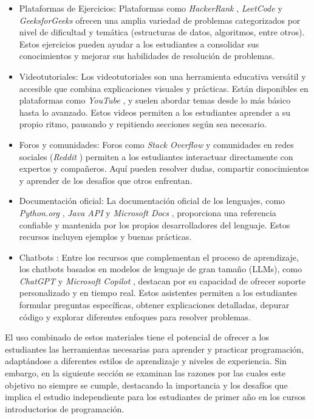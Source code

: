 \documentclass{article}
\begin{document}
\begin{itemize}
    \item Plataformas de Ejercicios: 
    Plataformas como \textit{HackerRank} \cite{hackerrank}, \textit{LeetCode} \cite{leetcode}  y \textit{GeeksforGeeks} \cite{geeksforgeeks} ofrecen una amplia variedad de problemas categorizados por nivel de dificultad y temática (estructuras de datos, algoritmos, entre otros). Estos ejercicios pueden ayudar a los estudiantes a consolidar sus conocimientos y mejorar sus habilidades de resolución de problemas.

    \item Videotutoriales:
    Los videotutoriales son una herramienta educativa versátil y accesible que combina explicaciones visuales y prácticas. Están disponibles en plataformas como \textit{YouTube} \cite{youtube}, y suelen abordar temas desde lo más básico hasta lo avanzado. Estos videos permiten a los estudiantes aprender a su propio ritmo, pausando y repitiendo secciones según sea necesario.

    \item Foros y comunidades: 
    Foros como \textit{Stack Overflow} \cite{stackoverflow} y comunidades en redes sociales (\textit{Reddit} \cite{reddit}) permiten a los estudiantes interactuar directamente con expertos y compañeros. Aquí pueden resolver dudas, compartir conocimientos y aprender de los desafíos que otros enfrentan.
    
    \item Documentación oficial:
    La documentación oficial de los lenguajes, como \textit{Python.org} \cite{python}, \textit{Java API} \cite{java-api} y \textit{Microsoft Docs} \cite{microsoft-docs}, proporciona una referencia confiable y mantenida por los propios desarrolladores del lenguaje. Estos recursos incluyen ejemplos y buenas prácticas.
    
    \item Chatbots : Entre los recursos que complementan el proceso de aprendizaje, los chatbots basados en modelos de lenguaje de gran tamaño (LLMs), como \textit{ChatGPT} \cite{chatgpt} y \textit{Microsoft Copilot} \cite{copilot}, destacan por su capacidad de ofrecer soporte personalizado y en tiempo real. Estos asistentes permiten a los estudiantes formular preguntas específicas, obtener explicaciones detalladas, depurar código y explorar diferentes enfoques para resolver problemas.
\end{itemize}

El uso combinado de estos materiales tiene el potencial de ofrecer a los estudiantes las herramientas necesarias para aprender y practicar programación, adaptándose a diferentes estilos de aprendizaje y niveles de experiencia. Sin embargo, en la siguiente sección se examinan las razones por las cuales este objetivo no siempre se cumple, destacando la importancia y los desafíos que implica el estudio independiente para los estudiantes de primer año en los cursos introductorios de programación.
\end{document}
